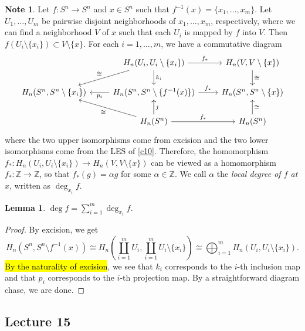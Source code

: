 \documentclass[10pt,letterpaper,cm]{nupset}
\theoremstyle{definition}
\newtheorem{note}[definition]{Note}
\theoremstyle{theorem}
\newtheorem{lemma}[definition]{Lemma}
\theoremstyle{remark}
\newcommand{\Z}{\mathbb Z}
\newcommand{\1}{\mathbb{1}}
\newcommand{\0}{\vec 0}
\begin{document}
\begin{note}
Let $f: S^n \to S^n$ and $x\in S^n$ such that $f^{-1}(x)= \{x_1, \ldots, x_m\}$. Let $U_1, \ldots, U_m$ be pairwise disjoint neighborhoods of $x_1, \ldots, x_m$, respectively, where we can find a neighborhood $V$ of $x$ such that each $U_i$ is mapped by $f$ into $V$. Then $f(U_i \setminus \{x_i\}) \subset V \setminus \{x\}$. For each $i=1, \ldots, m$, we have a commutative diagram
\[
\begin{tikzcd}
                                 & {H_n(U_i, U_i \setminus \{x_i\})} \arrow[ld, "\cong"'] \arrow[d, "k_i"] \arrow[r, "f_{\ast}"] & {H_n(V, V\setminus \{x\})} \arrow[d, "\cong"] \\
{H_n(S^n, S^n\setminus \{x_i\})} & {H_n(S^n, S^n \setminus \{f^{-1}(x)\})} \arrow[r, "f_{\ast}"] \arrow[l, "p_i"]                & {H_n(S^n, S^n \setminus \{x\})}               \\
                                 & H_n(S^n) \arrow[lu, "\cong"] \arrow[u, "j"'] \arrow[r, "f_{\ast}"] \arrow[u]                  & H_n(S^n) \arrow[u, "\cong"']                 
\end{tikzcd}
\] where the two upper isomorphisms come from excision and the two lower isomorphisms come from the LES of \cref{c10}. Therefore, the homomorphism $f_{\ast} : H_n(U_i, U_i \setminus \{x_i\}) \to H_n(V, V\setminus \{x\})$ can be viewed as a homomorphism $f_{\ast} : \Z \to \Z$, so that $f_{\ast}(g) = \alpha g$ for some $\alpha \in \Z$. We call $\alpha$ the \textit{local degree of $f$ at $x$}, written as $\deg_{x_i}{f}$.
\end{note}

\begin{lemma}
$\deg{f}  = \sum_{i=1}^m \deg_{x_i}{f}$.
\end{lemma}
\begin{proof}
By excision, we get $$H_n(S^n, S^n \setminus f^{-1}(x)) \cong H_n(\coprod_{i=1}^m U_i,  \coprod_{i=1}^m U_i \setminus \{x_i\}) \cong \bigoplus_{i=1}^m H_n(U_i, U_i \setminus \{x_i\}).$$ \hl{By the naturality of excision}, we see that $k_i$ corresponds to the $i$-th inclusion map and that $p_i$ corresponds to the $i$-th projection map. By a straightforward diagram chase, we are done.
\end{proof}

\subsection{Lecture 15}
\end{document}
